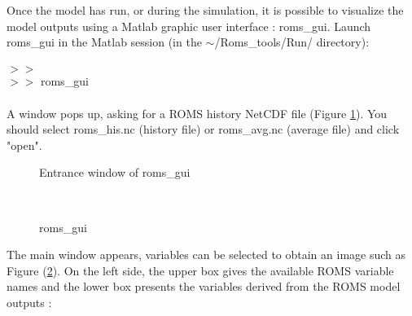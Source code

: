 Once the model has run, or during the simulation, it is possible
to visualize the model outputs using a Matlab graphic user interface : 
roms\_gui. Launch roms\_gui in the Matlab session 
(in the  $\sim$/Roms\_tools/Run/ directory):
\\ \\
$>>$ \\
$>>$ roms\_gui
\\\\
A window pops up, asking for a ROMS history NetCDF file (Figure \ref{fig:open}).
You should select roms\_his.nc (history file) or roms\_avg.nc (average file) and
click "open".
\begin{figure}[!ht]
\centerline{}
\caption{Entrance window of roms\_gui}
\label{fig:open}
\end{figure}
\\
\begin{figure}[!ht]
  \centerline{}
\caption{roms\_gui}
\label{fig:romsgui}
\end{figure}

The main window appears, variables can be selected to obtain an image such as
Figure (\ref{fig:romsgui}). On the left side, the upper box  gives the available 
ROMS variable names and the lower box presents the variables derived from the
ROMS model outputs :

